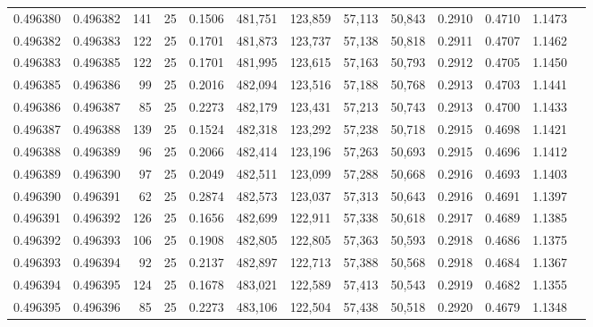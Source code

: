 \begin{tabular}{rrrrrrrrrrrrr}
0.496380 & 0.496382 &   141 &  25 &                                     0.1506 & 481,751 & 123,859 &  57,113 &  50,843 & 0.2910 & 0.4710 & 1.1473 \\
0.496382 & 0.496383 &   122 &  25 &                                     0.1701 & 481,873 & 123,737 &  57,138 &  50,818 & 0.2911 & 0.4707 & 1.1462 \\
0.496383 & 0.496385 &   122 &  25 &                                     0.1701 & 481,995 & 123,615 &  57,163 &  50,793 & 0.2912 & 0.4705 & 1.1450 \\
0.496385 & 0.496386 &    99 &  25 &                                     0.2016 & 482,094 & 123,516 &  57,188 &  50,768 & 0.2913 & 0.4703 & 1.1441 \\
0.496386 & 0.496387 &    85 &  25 &                                     0.2273 & 482,179 & 123,431 &  57,213 &  50,743 & 0.2913 & 0.4700 & 1.1433 \\
0.496387 & 0.496388 &   139 &  25 &                                     0.1524 & 482,318 & 123,292 &  57,238 &  50,718 & 0.2915 & 0.4698 & 1.1421 \\
0.496388 & 0.496389 &    96 &  25 &                                     0.2066 & 482,414 & 123,196 &  57,263 &  50,693 & 0.2915 & 0.4696 & 1.1412 \\
0.496389 & 0.496390 &    97 &  25 &                                     0.2049 & 482,511 & 123,099 &  57,288 &  50,668 & 0.2916 & 0.4693 & 1.1403 \\
0.496390 & 0.496391 &    62 &  25 &                                     0.2874 & 482,573 & 123,037 &  57,313 &  50,643 & 0.2916 & 0.4691 & 1.1397 \\
0.496391 & 0.496392 &   126 &  25 &                                     0.1656 & 482,699 & 122,911 &  57,338 &  50,618 & 0.2917 & 0.4689 & 1.1385 \\
0.496392 & 0.496393 &   106 &  25 &                                     0.1908 & 482,805 & 122,805 &  57,363 &  50,593 & 0.2918 & 0.4686 & 1.1375 \\
0.496393 & 0.496394 &    92 &  25 &                                     0.2137 & 482,897 & 122,713 &  57,388 &  50,568 & 0.2918 & 0.4684 & 1.1367 \\
0.496394 & 0.496395 &   124 &  25 &                                     0.1678 & 483,021 & 122,589 &  57,413 &  50,543 & 0.2919 & 0.4682 & 1.1355 \\
0.496395 & 0.496396 &    85 &  25 &                                     0.2273 & 483,106 & 122,504 &  57,438 &  50,518 & 0.2920 & 0.4679 & 1.1348 \\

\end{tabular}
